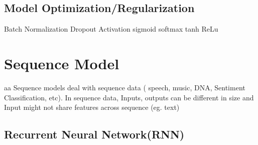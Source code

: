 \documentclass[11pt, openany]{book}              %
\begin{document}
\section{Model Optimization/Regularization}
		Batch Normalization
		Dropout
		Activation
			sigmoid
			softmax
			tanh
			ReLu


\chapter{Sequence Model}
aa
Sequence models deal with sequence data ( speech, music, DNA, Sentiment Classification, etc). In sequence data, Inputs, outputs can be different in size and Input might not share features across sequence (eg. text)

\section{Recurrent Neural Network(RNN)}
\end{document}
